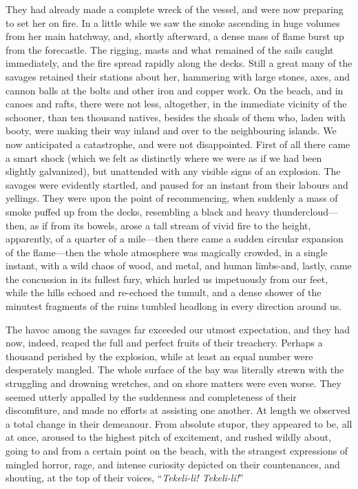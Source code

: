 They had already made a complete wreck of the vessel, and were now preparing
to set her on fire. In a little while we saw the smoke ascending in huge volumes
from her main hatchway, and, shortly afterward, a dense mass of flame burst up
from the forecastle. The rigging, masts and what remained of the sails caught
immediately, and the fire spread rapidly along the decks. Still a great many of
the savages retained their stations about her, hammering with large stones,
axes, and cannon balls at the bolts and other iron and copper work. On the
beach, and in canoes and rafts, there were not less, altogether, in the
immediate vicinity of the schooner, than ten thousand natives, besides the
shoals of them who, laden with booty, were making their way inland and over to
the neighbouring islands. We now anticipated a catastrophe, and were not
disappointed. First of all there came a smart shock (which we felt as distinctly
where we were as if we had been slightly galvanized), but unattended with any
visible signs of an explosion. The savages were evidently startled, and paused
for an instant from their labours and yellings. They were upon the point of
recommencing, when suddenly a mass of smoke puffed up from the decks, resembling
a black and heavy thundercloud---then, as if from its bowels, arose a tall
stream of vivid fire to the height, apparently, of a quarter of a mile---then
there came a sudden circular expansion of the flame---then the whole atmosphere
was magically crowded, in a single instant, with a wild chaos of wood, and
metal, and human limbs-and, lastly, came the concussion in its fullest fury,
which hurled us impetuously from our feet, while the hills echoed and re-echoed
the tumult, and a dense shower of the minutest fragments of the ruins tumbled
headlong in every direction around us. 

The havoc among the savages far exceeded our utmost expectation, and they had
now, indeed, reaped the full and perfect fruits of their treachery. Perhaps a
thousand perished by the explosion, while at least an equal number were
desperately mangled. The whole surface of the bay was literally strewn with the
struggling and drowning wretches, and on shore matters were even worse. They
seemed utterly appalled by the suddenness and completeness of their
discomfiture, and made no efforts at assisting one another. At length we
observed a total change in their demeanour. From absolute stupor, they appeared
to be, all at once, aroused to the highest pitch of excitement, and rushed
wildly about, going to and from a certain point on the beach, with the strangest
expressions of mingled horror, rage, and intense curiosity depicted on their
countenances, and shouting, at the top of their voices, ``\emph{Tekeli-li!
Tekeli-li!}'' 

